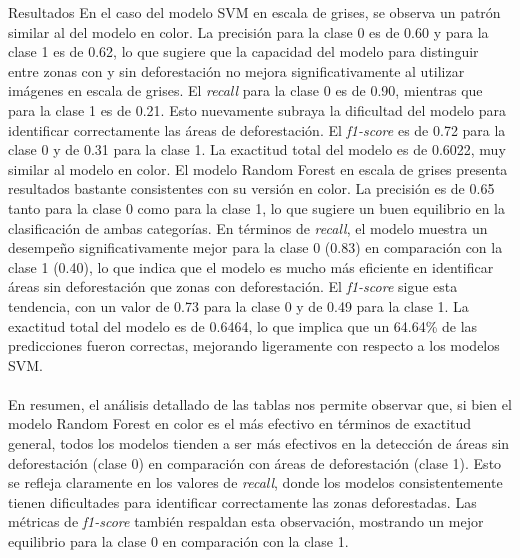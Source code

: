 \documentclass[11pt]{article}
\begin{document}
\begin{section}{Resultados}
En el caso del modelo SVM en escala de grises, se observa un patrón similar al del modelo en color. La precisión para la clase 0 es de 0.60 y para la clase 1 es de 0.62, lo que sugiere que la capacidad del modelo para distinguir entre zonas con y sin deforestación no mejora significativamente al utilizar imágenes en escala de grises. El \textit{recall} para la clase 0 es de 0.90, mientras que para la clase 1 es de 0.21. Esto nuevamente subraya la dificultad del modelo para identificar correctamente las áreas de deforestación. El \textit{f1-score} es de 0.72 para la clase 0 y de 0.31 para la clase 1. La exactitud total del modelo es de 0.6022, muy similar al modelo en color. El modelo Random Forest en escala de grises presenta resultados bastante consistentes con su versión en color. La precisión es de 0.65 tanto para la clase 0 como para la clase 1, lo que sugiere un buen equilibrio en la clasificación de ambas categorías. En términos de \textit{recall}, el modelo muestra un desempeño significativamente mejor para la clase 0 (0.83) en comparación con la clase 1 (0.40), lo que indica que el modelo es mucho más eficiente en identificar áreas sin deforestación que zonas con deforestación. El \textit{f1-score} sigue esta tendencia, con un valor de 0.73 para la clase 0 y de 0.49 para la clase 1. La exactitud total del modelo es de 0.6464, lo que implica que un 64.64\% de las predicciones fueron correctas, mejorando ligeramente con respecto a los modelos SVM.
\\
\\
En resumen, el análisis detallado de las tablas nos permite observar que, si bien el modelo Random Forest en color es el más efectivo en términos de exactitud general, todos los modelos tienden a ser más efectivos en la detección de áreas sin deforestación (clase 0) en comparación con áreas de deforestación (clase 1). Esto se refleja claramente en los valores de \textit{recall}, donde los modelos consistentemente tienen dificultades para identificar correctamente las zonas deforestadas. Las métricas de \textit{f1-score} también respaldan esta observación, mostrando un mejor equilibrio para la clase 0 en comparación con la clase 1.


\end{section}
\end{document}
